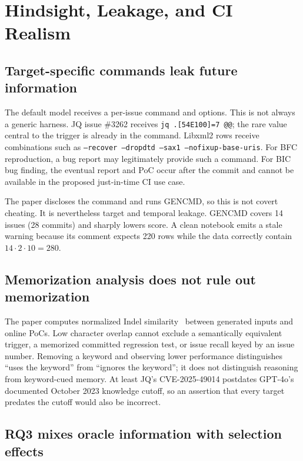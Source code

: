 \documentclass{article}
\begin{document}
\section{Hindsight, Leakage, and CI Realism}
\label{sec:leakage}

\subsection{Target-specific commands leak future information}

The default model receives a per-issue command and options.  This is not always
a generic harness.  JQ issue \#3262 receives
\texttt{jq .[54E100]=7 @@}; the rare value central to the trigger is already in
the command.  Libxml2 rows receive combinations such as
\texttt{--recover --dropdtd --sax1 --nofixup-base-uris}.  For BFC reproduction,
a bug report may legitimately provide such a command.  For BIC bug finding,
the eventual report and PoC occur after the commit and cannot be available in
the proposed just-in-time CI use case.

The paper discloses the command and runs GENCMD, so this is not covert cheating.
It is nevertheless target and temporal leakage.  GENCMD covers 14 issues (28
commits) and sharply lowers score.  A clean notebook emits a stale warning
because its comment expects 220 rows while the data correctly contain
$14\cdot2\cdot10=280$.

\subsection{Memorization analysis does not rule out memorization}

The paper computes normalized Indel similarity~\cite{rapidfuzz_ratio} between
generated inputs and online PoCs.  Low character overlap cannot exclude a
semantically equivalent trigger, a memorized committed regression test, or
issue recall keyed by an issue number.  Removing a keyword and observing lower
performance distinguishes ``uses the keyword'' from ``ignores the keyword'';
it does not distinguish reasoning from keyword-cued memory.  At least JQ's
CVE-2025-49014 postdates GPT-4o's documented October 2023 knowledge cutoff, so
an assertion that every target predates the cutoff would also be incorrect.

\subsection{RQ3 mixes oracle information with selection effects}
\end{document}
